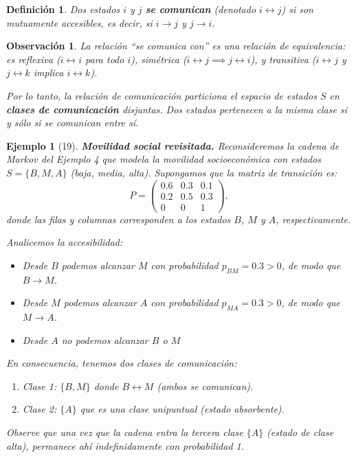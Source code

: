 \documentclass[12pt]{book}
\newtheorem{definition}{Definición}[chapter]
\newtheorem{example}{Ejemplo}[chapter]
\newtheorem{remark}{Observación}[chapter]
\begin{document}
\begin{definition}
Dos estados $i$ y $j$ \textbf{se comunican} (denotado $i \leftrightarrow j$) si son mutuamente accesibles, es decir, si $i \to j$ y $j \to i$.
\end{definition}

\begin{remark}
La relación ``se comunica con'' es una relación de equivalencia: es reflexiva ($i \leftrightarrow i$ para todo $i$), simétrica ($i \leftrightarrow j \implies j \leftrightarrow i$), y transitiva ($i \leftrightarrow j$ y $j \leftrightarrow k$ implica $i \leftrightarrow k$). 

Por lo tanto, la relación de comunicación particiona el espacio de estados $S$ en \textbf{clases de comunicación} disjuntas. Dos estados pertenecen a la misma clase si y sólo si se comunican entre sí.
\end{remark}

\begin{example}[19]
\textbf{Movilidad social revisitada.} Reconsideremos la cadena de Markov del Ejemplo 4 que modela la movilidad socioeconómica con estados $S = \{B, M, A\}$ (baja, media, alta). Supongamos que la matriz de transición es:
\[
P = \begin{pmatrix}
0.6 & 0.3 & 0.1 \\
0.2 & 0.5 & 0.3 \\
0 & 0 & 1
\end{pmatrix},
\]
donde las filas y columnas corresponden a los estados $B$, $M$ y $A$, respectivamente.

Analicemos la accesibilidad:
\begin{itemize}
    \item Desde $B$ podemos alcanzar $M$ con probabilidad $p_{BM} = 0.3 > 0$, de modo que $B \to M$.
    \item Desde $M$ podemos alcanzar $A$ con probabilidad $p_{MA} = 0.3 > 0$, de modo que $M \to A$.
    \item Desde $A$ no podemos alcanzar $B$ o $M$ 
\end{itemize}

En consecuencia, tenemos dos clases de comunicación:
\begin{enumerate}
    \item Clase 1: $\{B, M\}$ donde $B \leftrightarrow M$ (ambos se comunican).
    \item Clase 2: $\{A\}$ que es una clase unipuntual (estado absorbente).
\end{enumerate}

Observe que una vez que la cadena entra la tercera clase $\{A\}$ (estado de clase alta), permanece ahí indefinidamente con probabilidad 1.
\end{example}
\end{document}
